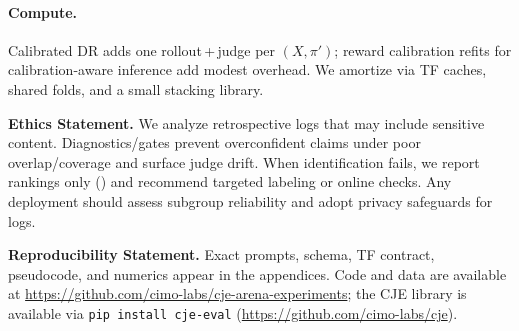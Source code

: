 \paragraph{Compute.}
Calibrated DR adds one rollout\,+\,judge per $(X,\pi')$; reward calibration refits for calibration-aware inference add modest overhead.
We amortize via TF caches, shared folds, and a small stacking library.

\noindent\textbf{Ethics Statement.}
We analyze retrospective logs that may include sensitive content.
Diagnostics/gates prevent overconfident claims under poor overlap/coverage and surface judge drift.
When identification fails, we report rankings only (\RefuseLevel) and recommend targeted labeling or online checks.
Any deployment should assess subgroup reliability and adopt privacy safeguards for logs.

\noindent\textbf{Reproducibility Statement.}
Exact prompts, schema, TF contract, pseudocode, and numerics appear in the appendices.
Code and data are available at \url{https://github.com/cimo-labs/cje-arena-experiments}; the CJE library is available via \texttt{pip install cje-eval} (\url{https://github.com/cimo-labs/cje}).
